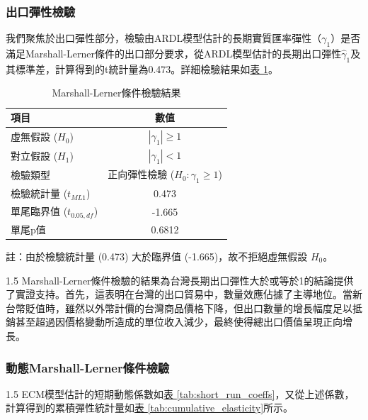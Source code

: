 \documentclass[a4paper,12pt]{article}
\begin{document}
\subsubsection{出口彈性檢驗}
我們聚焦於出口彈性部分，檢驗由ARDL模型估計的長期實質匯率彈性（$\gamma_1$）是否滿足Marshall-Lerner條件的出口部分要求，從ARDL模型估計的長期出口彈性$\hat{\gamma}_1$及其標準差，計算得到的t統計量為0.473。詳細檢驗結果如\hspace{1pt}\hyperref[tab:ml_test]{表 \ref{tab:ml_test}}。
\begin{table}[h]
    \centering
    \begin{threeparttable}
        \caption{Marshall-Lerner條件檢驗結果}
        \label{tab:ml_test}
        \begin{tabular}{lc}
            \toprule
            項目 & 數值 \\
            \midrule
            虛無假設 ($H_0$) & $|\gamma_1| \geq 1$ \\
            對立假設 ($H_1$) & $|\gamma_1| < 1$ \\
            檢驗類型 & 正向彈性檢驗 ($H_0: \gamma_1 \geq 1$) \\
            檢驗統計量 ($t_{ML1}$) & 0.473 \\
            單尾臨界值 ($t_{0.05, df}$) & -1.665 \\
            單尾p值 & 0.6812 \\
            \bottomrule
        \end{tabular}
        \begin{tablenotes}
            \footnotesize
            \item 註：由於檢驗統計量 (0.473) 大於臨界值 (-1.665)，故不拒絕虛無假設 $H_0$。
        \end{tablenotes}
    \end{threeparttable}
\end{table}
\begin{spacing}{1.5}
Marshall-Lerner條件檢驗的結果為台灣長期出口彈性大於或等於1的結論提供了實證支持。首先，這表明在台灣的出口貿易中，數量效應佔據了主導地位。當新台幣貶值時，雖然以外幣計價的台灣商品價格下降，但出口數量的增長幅度足以抵銷甚至超過因價格變動所造成的單位收入減少，最終使得總出口價值呈現正向增長。
\end{spacing}
\vspace{-0.5cm}
\subsubsection{動態Marshall-Lerner條件檢驗}
\begin{spacing}{1.5}
ECM模型估計的短期動態係數如\hspace{1pt}\hyperref[tab:short_run_coeffs]{表 \ref{tab:short_run_coeffs}}，又從上述係數，計算得到的累積彈性統計量如\hspace{1pt}\hyperref[tab:cumulative_elasticity]{表 \ref{tab:cumulative_elasticity}}所示。
\end{spacing}
\end{document}
